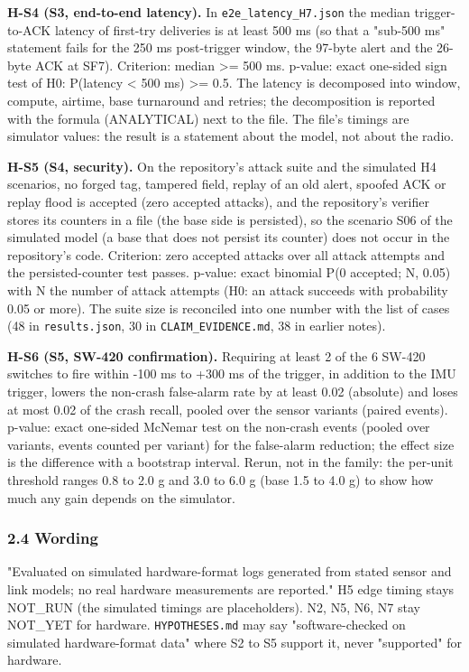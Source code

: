 \textbf{H-S4 (S3, end-to-end latency).} In \texttt{e2e\_latency\_H7.json} the median trigger-to-ACK latency of first-try deliveries is at least 500 ms (so that a "sub-500 ms" statement fails for the 250 ms post-trigger window, the 97-byte alert and the 26-byte ACK at SF7). Criterion: median >= 500 ms. p-value: exact one-sided sign test of H0: P(latency < 500 ms) >= 0.5. The latency is decomposed into window, compute, airtime, base turnaround and retries; the decomposition is reported with the formula (ANALYTICAL) next to the file. The file's timings are simulator values: the result is a statement about the model, not about the radio.

\textbf{H-S5 (S4, security).} On the repository's attack suite and the simulated H4 scenarios, no forged tag, tampered field, replay of an old alert, spoofed ACK or replay flood is accepted (zero accepted attacks), and the repository's verifier stores its counters in a file (the base side is persisted), so the scenario S06 of the simulated model (a base that does not persist its counter) does not occur in the repository's code. Criterion: zero accepted attacks over all attack attempts and the persisted-counter test passes. p-value: exact binomial P(0 accepted; N, 0.05) with N the number of attack attempts (H0: an attack succeeds with probability 0.05 or more). The suite size is reconciled into one number with the list of cases (48 in \texttt{results.json}, 30 in \texttt{CLAIM\_EVIDENCE.md}, 38 in earlier notes).

\textbf{H-S6 (S5, SW-420 confirmation).} Requiring at least 2 of the 6 SW-420 switches to fire within -100 ms to +300 ms of the trigger, in addition to the IMU trigger, lowers the non-crash false-alarm rate by at least 0.02 (absolute) and loses at most 0.02 of the crash recall, pooled over the sensor variants (paired events). p-value: exact one-sided McNemar test on the non-crash events (pooled over variants, events counted per variant) for the false-alarm reduction; the effect size is the difference with a bootstrap interval. Rerun, not in the family: the per-unit threshold ranges 0.8 to 2.0 g and 3.0 to 6.0 g (base 1.5 to 4.0 g) to show how much any gain depends on the simulator.

\subsubsection*{2.4 Wording}
"Evaluated on simulated hardware-format logs generated from stated sensor and link models; no real hardware measurements are reported." H5 edge timing stays NOT\_RUN (the simulated timings are placeholders). N2, N5, N6, N7 stay NOT\_YET for hardware. \texttt{HYPOTHESES.md} may say "software-checked on simulated hardware-format data" where S2 to S5 support it, never "supported" for hardware.

